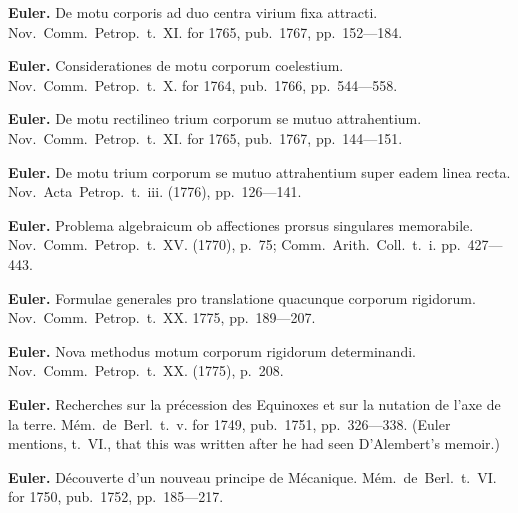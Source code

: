 \documentclass[12pt,a4paper]{article}
\theoremstyle{definition}
\begin{document}
\vspace{0.5em}

\noindent\textbf{Euler.} De motu corporis ad duo centra virium fixa attracti. Nov.~Comm.~Petrop.~t.~XI. for 1765, pub.~1767, pp.~152---184.

\vspace{0.5em}

\noindent\textbf{Euler.} Considerationes de motu corporum coelestium. Nov.~Comm.~Petrop.~t.~X. for 1764, pub.~1766, pp.~544---558.

\vspace{0.5em}

\noindent\textbf{Euler.} De motu rectilineo trium corporum se mutuo attrahentium. Nov.~Comm.~Petrop.~t.~XI. for 1765, pub.~1767, pp.~144---151.

\vspace{0.5em}

\noindent\textbf{Euler.} De motu trium corporum se mutuo attrahentium super eadem linea recta. Nov.~Acta~Petrop.~t.~iii. (1776), pp.~126---141.

\vspace{0.5em}

\noindent\textbf{Euler.} Problema algebraicum ob affectiones prorsus singulares memorabile. Nov.~Comm.~Petrop.~t.~XV. (1770), p.~75; Comm.~Arith.~Coll.~t.~i. pp.~427---443.

\vspace{0.5em}

\noindent\textbf{Euler.} Formulae generales pro translatione quacunque corporum rigidorum. Nov.~Comm.~Petrop.~t.~XX. 1775, pp.~189---207.

\vspace{0.5em}

\noindent\textbf{Euler.} Nova methodus motum corporum rigidorum determinandi. Nov.~Comm.~Petrop.~t.~XX. (1775), p.~208.

\vspace{0.5em}

\noindent\textbf{Euler.} Recherches sur la pr\'{e}cession des Equinoxes et sur la nutation de l'axe de la terre. M\'{e}m.~de~Berl.~t.~v. for 1749, pub.~1751, pp.~326---338. (Euler mentions, t.~VI., that this was written after he had seen D'Alembert's memoir.)

\vspace{0.5em}

\noindent\textbf{Euler.} D\'{e}couverte d'un nouveau principe de M\'{e}canique. M\'{e}m.~de~Berl.~t.~VI. for 1750, pub.~1752, pp.~185---217.
\end{document}
